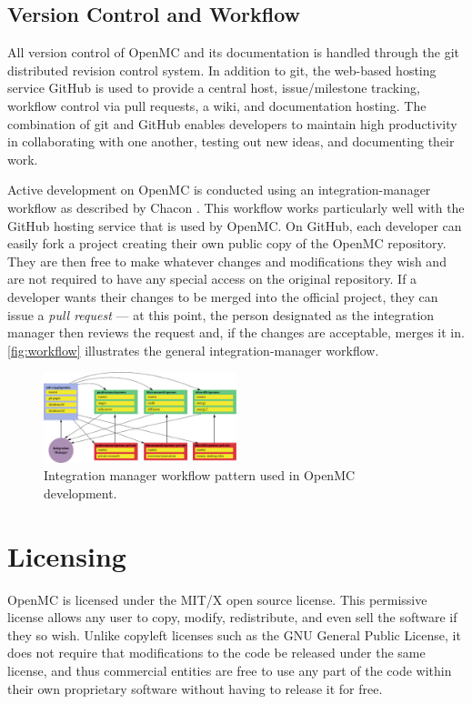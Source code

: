 \documentclass{snamc2013}
\begin{document}
\subsection{Version Control and Workflow}

All version control of OpenMC and its documentation is handled through the git
distributed revision control system. In addition to git, the web-based hosting
service GitHub is used to provide a central host, issue/milestone tracking,
workflow control via pull requests, a wiki, and documentation hosting. The
combination of git and GitHub enables developers to maintain high productivity
in collaborating with one another, testing out new ideas, and documenting their
work.

Active development on OpenMC is conducted using an integration-manager workflow
as described by Chacon \cite{chacon-2009}. This workflow works particularly well
with the GitHub hosting service that is used by OpenMC. On GitHub, each
developer can easily fork a project creating their own public copy of the OpenMC
repository. They are then free to make whatever changes and modifications they
wish and are not required to have any special access on the original
repository. If a developer wants their changes to be merged into the official
project, they can issue a \emph{pull request} --- at this point, the person
designated as the integration manager then reviews the request and, if the
changes are acceptable, merges it in. \autoref{fig:workflow} illustrates the
general integration-manager workflow.
\begin{figure}[htb]
  \centering
  \includegraphics[width=0.5\textwidth]{images/integration-manager.pdf}
  \caption{Integration manager workflow pattern used in OpenMC development.}
  \label{fig:workflow}
\end{figure}

\section{Licensing}

OpenMC is licensed under the MIT/X open source license. This permissive license
allows any user to copy, modify, redistribute, and even sell the software if
they so wish. Unlike copyleft licenses such as the GNU General Public License,
it does not require that modifications to the code be released under the same
license, and thus commercial entities are free to use any part of the code
within their own proprietary software without having to release it for free.
\end{document}

